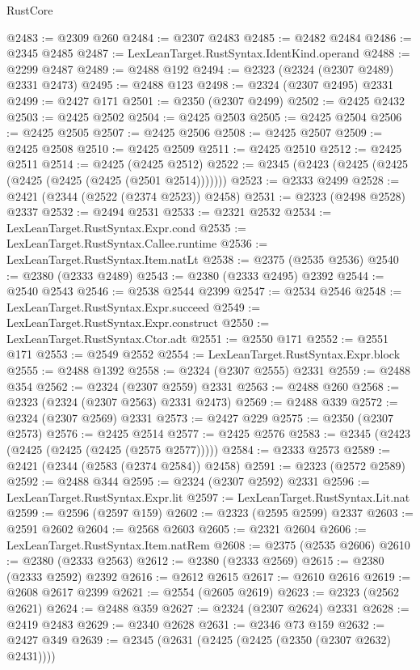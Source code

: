 \begin{lexlean}{RustCore}
\begin{coremodule}
@2483 := @2309 @260
@2484 := @2307 @2483
@2485 := @2482 @2484
@2486 := @2345 @2485
@2487 := LexLeanTarget.RustSyntax.IdentKind.operand
@2488 := @2299 @2487
@2489 := @2488 @192
@2494 := @2323 (@2324 (@2307 @2489) @2331 @2473)
@2495 := @2488 @123
@2498 := @2324 (@2307 @2495) @2331
@2499 := @2427 @171
@2501 := @2350 (@2307 @2499)
@2502 := @2425 @2432
@2503 := @2425 @2502
@2504 := @2425 @2503
@2505 := @2425 @2504
@2506 := @2425 @2505
@2507 := @2425 @2506
@2508 := @2425 @2507
@2509 := @2425 @2508
@2510 := @2425 @2509
@2511 := @2425 @2510
@2512 := @2425 @2511
@2514 := @2425 (@2425 @2512)
@2522 := @2345 (@2423 (@2425 (@2425 (@2425 (@2425 (@2425 (@2501 @2514)))))))
@2523 := @2333 @2499
@2528 := @2421 (@2344 (@2522 (@2374 @2523)) @2458)
@2531 := @2323 (@2498 @2528) @2337
@2532 := @2494 @2531
@2533 := @2321 @2532
@2534 := LexLeanTarget.RustSyntax.Expr.cond
@2535 := LexLeanTarget.RustSyntax.Callee.runtime
@2536 := LexLeanTarget.RustSyntax.Item.natLt
@2538 := @2375 (@2535 @2536)
@2540 := @2380 (@2333 @2489)
@2543 := @2380 (@2333 @2495) @2392
@2544 := @2540 @2543
@2546 := @2538 @2544 @2399
@2547 := @2534 @2546
@2548 := LexLeanTarget.RustSyntax.Expr.succeed
@2549 := LexLeanTarget.RustSyntax.Expr.construct
@2550 := LexLeanTarget.RustSyntax.Ctor.adt
@2551 := @2550 @171
@2552 := @2551 @171
@2553 := @2549 @2552
@2554 := LexLeanTarget.RustSyntax.Expr.block
@2555 := @2488 @1392
@2558 := @2324 (@2307 @2555) @2331
@2559 := @2488 @354
@2562 := @2324 (@2307 @2559) @2331
@2563 := @2488 @260
@2568 := @2323 (@2324 (@2307 @2563) @2331 @2473)
@2569 := @2488 @339
@2572 := @2324 (@2307 @2569) @2331
@2573 := @2427 @229
@2575 := @2350 (@2307 @2573)
@2576 := @2425 @2514
@2577 := @2425 @2576
@2583 := @2345 (@2423 (@2425 (@2425 (@2425 (@2575 @2577)))))
@2584 := @2333 @2573
@2589 := @2421 (@2344 (@2583 (@2374 @2584)) @2458)
@2591 := @2323 (@2572 @2589)
@2592 := @2488 @344
@2595 := @2324 (@2307 @2592) @2331
@2596 := LexLeanTarget.RustSyntax.Expr.lit
@2597 := LexLeanTarget.RustSyntax.Lit.nat
@2599 := @2596 (@2597 @159)
@2602 := @2323 (@2595 @2599) @2337
@2603 := @2591 @2602
@2604 := @2568 @2603
@2605 := @2321 @2604
@2606 := LexLeanTarget.RustSyntax.Item.natRem
@2608 := @2375 (@2535 @2606)
@2610 := @2380 (@2333 @2563)
@2612 := @2380 (@2333 @2569)
@2615 := @2380 (@2333 @2592) @2392
@2616 := @2612 @2615
@2617 := @2610 @2616
@2619 := @2608 @2617 @2399
@2621 := @2554 (@2605 @2619)
@2623 := @2323 (@2562 @2621)
@2624 := @2488 @359
@2627 := @2324 (@2307 @2624) @2331
@2628 := @2419 @2483
@2629 := @2340 @2628
@2631 := @2346 @73 @159
@2632 := @2427 @349
@2639 := @2345 (@2631 (@2425 (@2425 (@2350 (@2307 @2632) @2431))))

\end{coremodule}
\end{lexlean}

